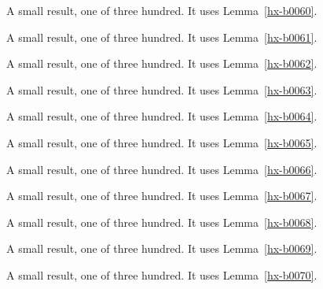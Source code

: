 \begin{lemma}[Bulk 61]\label{hx-b0061}
A small result, one of three hundred. It uses Lemma~\ref{hx-b0060}.
\end{lemma}

\begin{lemma}[Bulk 62]\label{hx-b0062}
A small result, one of three hundred. It uses Lemma~\ref{hx-b0061}.
\end{lemma}

\begin{lemma}[Bulk 63]\label{hx-b0063}
A small result, one of three hundred. It uses Lemma~\ref{hx-b0062}.
\end{lemma}

\begin{lemma}[Bulk 64]\label{hx-b0064}
A small result, one of three hundred. It uses Lemma~\ref{hx-b0063}.
\end{lemma}

\begin{lemma}[Bulk 65]\label{hx-b0065}
A small result, one of three hundred. It uses Lemma~\ref{hx-b0064}.
\end{lemma}

\begin{lemma}[Bulk 66]\label{hx-b0066}
A small result, one of three hundred. It uses Lemma~\ref{hx-b0065}.
\end{lemma}

\begin{lemma}[Bulk 67]\label{hx-b0067}
A small result, one of three hundred. It uses Lemma~\ref{hx-b0066}.
\end{lemma}

\begin{lemma}[Bulk 68]\label{hx-b0068}
A small result, one of three hundred. It uses Lemma~\ref{hx-b0067}.
\end{lemma}

\begin{lemma}[Bulk 69]\label{hx-b0069}
A small result, one of three hundred. It uses Lemma~\ref{hx-b0068}.
\end{lemma}

\begin{lemma}[Bulk 70]\label{hx-b0070}
A small result, one of three hundred. It uses Lemma~\ref{hx-b0069}.
\end{lemma}

\begin{lemma}[Bulk 71]\label{hx-b0071}
A small result, one of three hundred. It uses Lemma~\ref{hx-b0070}.
\end{lemma}

